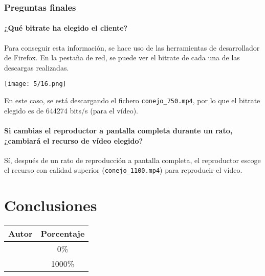 \subsubsection{Preguntas finales}
\paragraph{¿Qué bitrate ha elegido el cliente?}
Para conseguir esta información, se hace uso de las herramientas de desarrollador
de Firefox. En la pestaña de red, se puede ver el bitrate de cada una de las
descargas realizadas.

\begin{minipage}{\linewidth}
	\centering
	\texttt{[image: 5/16.png]}
	\label{fig:5/16}
\end{minipage}

En este caso, se está descargando el fichero \Verb#conejo_750.mp4#, por lo que
el bitrate elegido es de 644274 bits/s (para el vídeo).

\paragraph{Si cambias el reproductor a pantalla completa durante un rato, ¿cambiará el recurso de vídeo elegido?}
Sí, después de un rato de reproducción a pantalla completa, el reproductor escoge el recurso
con calidad superior (\Verb#conejo_1100.mp4#) para reproducir el vídeo.

\section{Conclusiones}

\begin{center}
	\begin{tabular}{|c|c|}
		\hline
		\textbf{Autor} & \textbf{Porcentaje} \\
		\hline
		\hline
		\authorOne & 0\% \\
		\authorTwo & 1000\% \\
		\hline
	\end{tabular}
\end{center}